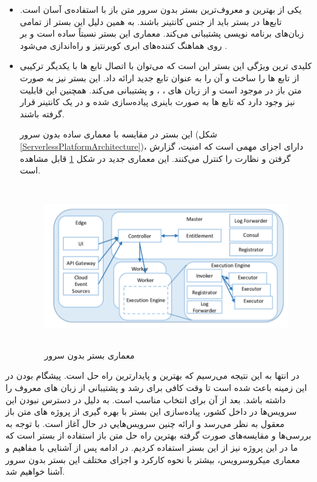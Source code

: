 \begin{itemize}
	\item \textbf{} یکی از بهترین و معروف‌ترین بستر بدون سرور متن باز با استفاده‌ی آسان است. تابع‌ها در بستر  باید از جنس کانتینر باشند. به همین دلیل این بستر از تمامی زبان‌های برنامه نویسی پشتیبانی می‌کند. معماری این بستر نسبتاً ساده است و بر روی هماهنگ کننده‌های ابری کوبرنتیز و  راه‌اندازی می‌شود \cite{openfaas}.
	
	\item \textbf{}  کلیدی ترین ویژگی این بستر این است که می‌توان با اتصال تابع ها با یکدیگر ترکیبی از تابع ها را ساخت و آن را به عنوان تابع جدید ارائه داد. این بستر نیز به صورت متن باز در  موجود است و از زبان های ، ،  و  پشتیبانی می‌کند. همچنین این قابلیت نیز وجود دارد که تابع ها به صورت باینری پیاده‌سازی شده و در یک کانتینر قرار گرفته باشند.
	
	این بستر در مقایسه با معماری ساده بدون سرور (شکل \ref{ServerlessPlatformArchitecture})، دارای اجزای مهمی است که امنیت، گزارش گرفتن و نظارت را کنترل می‌کنند. این معماری جدید در شکل \ref{OpenWhisk-architecture} قابل مشاهده است.
	
	\begin{figure}[!h]
		\centering
		\includegraphics[height=7cm]{images/OpenWhisk-architecture}
		\caption{معماری بستر بدون سرور }
		\label{OpenWhisk-architecture}
	\end{figure}
	
\end{itemize}

در انتها به این نتیجه می‌رسیم که بهترین و پایدارترین راه حل  است. پیشگام بودن در این زمینه باعث شده است تا وقت کافی برای رشد و پشتیبانی از زبان های معروف را داشته باشد. بعد از آن  برای انتخاب مناسب است. به دلیل در دسترس نبودن این سرویس‌ها در داخل کشور، پیاده‌سازی این بستر با بهره گیری از پروژه های متن باز معقول به نظر می‌رسد و ارائه چنين سرويس‌هايي در حال آغاز است. با توجه به بررسی‌ها و مقایسه‌های صورت گرفته بهترین راه حل متن باز استفاده از بستر  است که ما در این پروژه نیز از این بستر استفاده کردیم. در ادامه پس از آشنایی با مفاهیم و معماری میکروسرویس، بیشتر با نحوه کارکرد و اجزای مختلف این بستر بدون سرور آشنا خواهیم شد.

